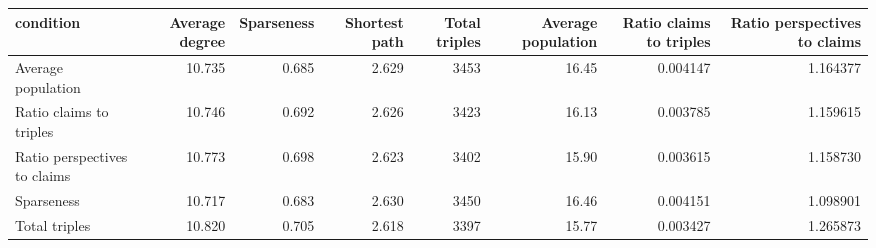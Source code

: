 \begin{tabular}{lrrrrrrr}
\toprule
                   condition &  Average degree &  Sparseness &  Shortest path &  Total triples &  Average population &  Ratio claims to triples &  Ratio perspectives to claims \\
\midrule
          Average population &          10.735 &       0.685 &          2.629 &           3453 &               16.45 &                 0.004147 &                      1.164377 \\
     Ratio claims to triples &          10.746 &       0.692 &          2.626 &           3423 &               16.13 &                 0.003785 &                      1.159615 \\
Ratio perspectives to claims &          10.773 &       0.698 &          2.623 &           3402 &               15.90 &                 0.003615 &                      1.158730 \\
                  Sparseness &          10.717 &       0.683 &          2.630 &           3450 &               16.46 &                 0.004151 &                      1.098901 \\
               Total triples &          10.820 &       0.705 &          2.618 &           3397 &               15.77 &                 0.003427 &                      1.265873 \\
\bottomrule
\end{tabular}
